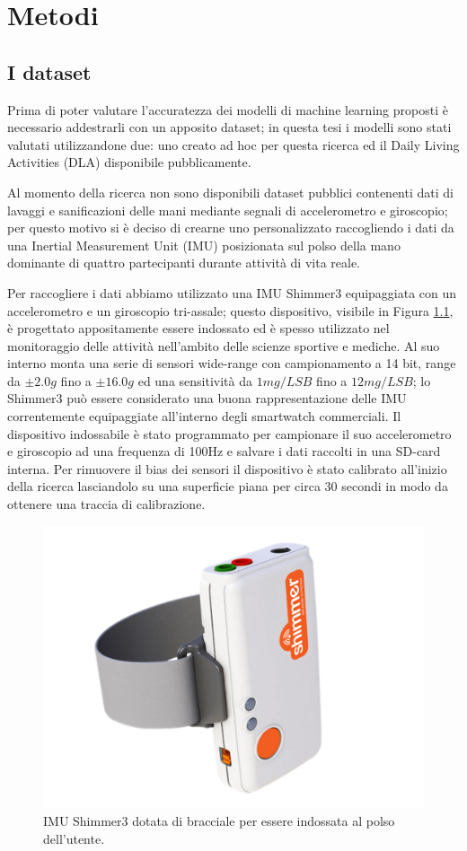 \chapter{Metodi}
\label{cap:metodo}

\section{I dataset}
\label{sec:dataset}

Prima di poter valutare l'accuratezza dei modelli di machine learning proposti è necessario addestrarli con un apposito dataset; in questa tesi i modelli sono stati valutati utilizzandone due: uno creato ad hoc per questa ricerca ed il Daily Living Activities (DLA) disponibile pubblicamente\cite{leotta2021daily}.

Al momento della ricerca non sono disponibili dataset pubblici contenenti dati di lavaggi e sanificazioni delle mani mediante segnali di accelerometro e giroscopio; per questo motivo si è deciso di crearne uno personalizzato raccogliendo i dati da una Inertial Measurement Unit (IMU) posizionata sul polso della mano dominante di quattro partecipanti durante attività di vita reale.

Per raccogliere i dati abbiamo utilizzato una IMU Shimmer3 equipaggiata con un accelerometro e un giroscopio tri-assale\cite{shimmer}; questo dispositivo, visibile in Figura \ref{fig:shimmer}, è progettato appositamente essere indossato ed è spesso utilizzato nel monitoraggio delle attività nell'ambito delle scienze sportive e mediche. Al suo interno monta una serie di sensori wide-range con campionamento a 14 bit, range da $\pm2.0g$ fino a $\pm16.0g$ ed una sensitività da $1mg/LSB$ fino a $12mg/LSB$; lo Shimmer3 può essere considerato una buona rappresentazione delle IMU correntemente equipaggiate all'interno degli smartwatch commerciali. Il dispositivo indossabile è stato programmato per campionare il suo accelerometro e giroscopio ad una frequenza di 100Hz e salvare i dati raccolti in una SD-card interna. Per rimuovere il bias dei sensori il dispositivo è stato calibrato all'inizio della ricerca lasciandolo su una superficie piana per circa 30 secondi in modo da ottenere una traccia di calibrazione.

\begin{figure}[!htb]
    \centering
    \includegraphics[width=.4\textwidth]{figure/shimmer.jpg}
    \caption{IMU Shimmer3 dotata di bracciale per essere indossata al polso dell'utente.}
    \label{fig:shimmer}
\end{figure}

